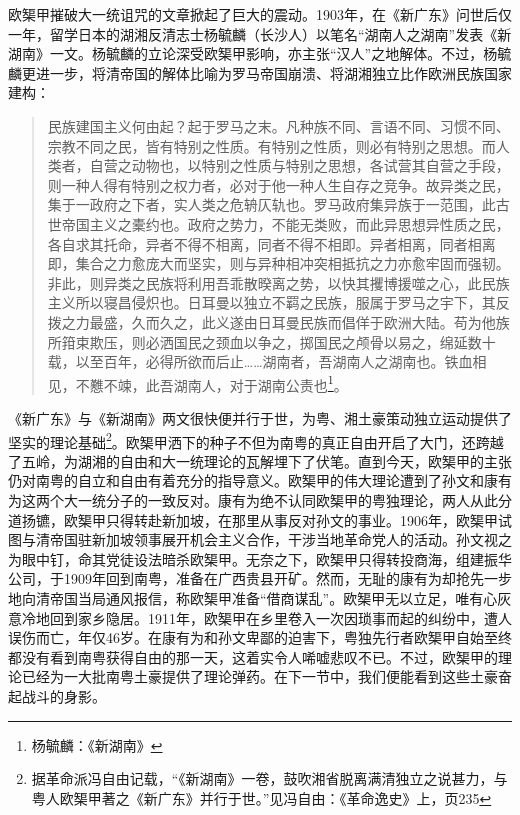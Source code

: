 欧榘甲摧破大一统诅咒的文章掀起了巨大的震动。1903年，在《新广东》问世后仅一年，留学日本的湖湘反清志士杨毓麟（长沙人）以笔名“湖南人之湖南”发表《新湖南》一文。杨毓麟的立论深受欧榘甲影响，亦主张“汉人”之地解体。不过，杨毓麟更进一步，将清帝国的解体比喻为罗马帝国崩溃、将湖湘独立比作欧洲民族国家建构：

\begin{quote}

民族建国主义何由起？起于罗马之末。凡种族不同、言语不同、习惯不同、宗教不同之民，皆有特别之性质。有特别之性质，则必有特别之思想。而人类者，自营之动物也，以特别之性质与特别之思想，各试营其自营之手段，则一种人得有特别之权力者，必对于他一种人生自存之竞争。故异类之民，集于一政府之下者，实人类之危辀仄轨也。罗马政府集异族于一范围，此古世帝国主义之橐约也。政府之势力，不能无类败，而此异思想异性质之民，各自求其托命，异者不得不相离，同者不得不相即。异者相离，同者相离即，集合之力愈庞大而坚实，则与异种相冲突相抵抗之力亦愈牢固而强韧。非此，则异类之民族将利用吾乖散暌离之势，以快其攫博援噬之心，此民族主义所以寝昌侵炽也。日耳曼以独立不羁之民族，服属于罗马之宇下，其反拨之力最盛，久而久之，此义遂由日耳曼民族而倡佯于欧洲大陆。苟为他族所箝束欺压，则必洒国民之颈血以争之，掷国民之颅骨以易之，绵延数十载，以至百年，必得所欲而后止……湖南者，吾湖南人之湖南也。铁血相见，不戁不竦，此吾湖南人，对于湖南公责也\footnote{杨毓麟：《新湖南》}。

\end{quote}

《新广东》与《新湖南》两文很快便并行于世，为粤、湘土豪策动独立运动提供了坚实的理论基础\footnote{据革命派冯自由记载，“《新湖南》一卷，鼓吹湘省脱离满清独立之说甚力，与粤人欧榘甲著之《新广东》并行于世。”见冯自由：《革命逸史》上，页235}。欧榘甲洒下的种子不但为南粤的真正自由开启了大门，还跨越了五岭，为湖湘的自由和大一统理论的瓦解埋下了伏笔。直到今天，欧榘甲的主张仍对南粤的自立和自由有着充分的指导意义。欧榘甲的伟大理论遭到了孙文和康有为这两个大一统分子的一致反对。康有为绝不认同欧榘甲的粤独理论，两人从此分道扬镳，欧榘甲只得转赴新加坡，在那里从事反对孙文的事业。1906年，欧榘甲试图与清帝国驻新加坡领事展开机会主义合作，干涉当地革命党人的活动。孙文视之为眼中钉，命其党徒设法暗杀欧榘甲。无奈之下，欧榘甲只得转投商海，组建振华公司，于1909年回到南粤，准备在广西贵县开矿。然而，无耻的康有为却抢先一步地向清帝国当局通风报信，称欧榘甲准备“借商谋乱”。欧榘甲无以立足，唯有心灰意冷地回到家乡隐居。1911年，欧榘甲在乡里卷入一次因琐事而起的纠纷中，遭人误伤而亡，年仅46岁。在康有为和孙文卑鄙的迫害下，粤独先行者欧榘甲自始至终都没有看到南粤获得自由的那一天，这着实令人唏嘘悲叹不已。不过，欧榘甲的理论已经为一大批南粤土豪提供了理论弹药。在下一节中，我们便能看到这些土豪奋起战斗的身影。


